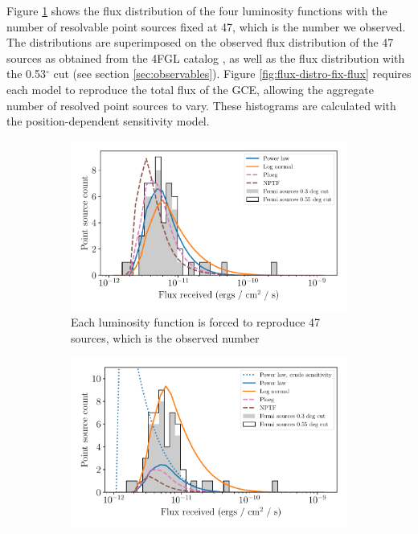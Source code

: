 \documentclass[a4paper,11pt]{article}
\begin{document}
Figure \ref{fig:flux-distro-fix-count} shows the flux distribution of the four luminosity functions with the number of resolvable point sources fixed at 47, which is the number we observed. The distributions are superimposed on the observed flux distribution of the 47 sources as obtained from the 4FGL catalog \cite{Fermi-LAT:2019yla}, as well as the flux distribution with the 0.53$^\circ$ cut (see section \ref{sec:observables}). Figure \ref{fig:flux-distro-fix-flux} requires each model to reproduce the total flux of the GCE, allowing the aggregate number of resolved point sources to vary. These histograms are calculated with the position-dependent sensitivity model.

\begin{figure}
    \centering
    \begin{subfigure}[b]{0.47\textwidth}
        \includegraphics[width=\textwidth]{figs/flux-distro-fix-count.pdf}
        \caption{Each luminosity function is forced to reproduce 47 sources, which is the observed number}
        \label{fig:flux-distro-fix-count}
    \end{subfigure}
    \hfill
    \begin{subfigure}[b]{0.47\textwidth}
        \includegraphics[width=\textwidth]{figs/flux-distro-fix-flux.pdf}

\end{subfigure}
\end{figure}
\end{document}
